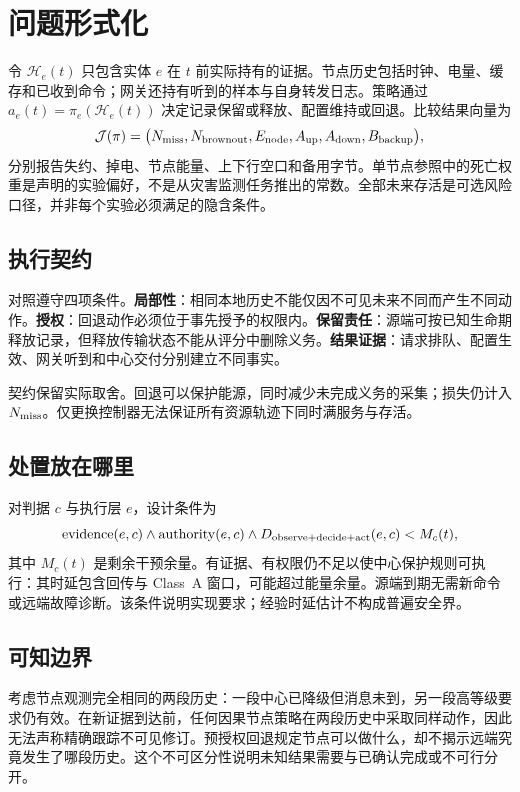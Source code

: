 \documentclass[11pt]{article}
\begin{document}
\section{问题形式化}
\label{sec:problem}

令 $\mathcal H_e(t)$ 只包含实体 $e$ 在 $t$ 前实际持有的证据。节点历史包括时钟、电量、缓存和已收到命令；网关还持有听到的样本与自身转发日志。策略通过 $a_e(t)=\pi_e(\mathcal H_e(t))$ 决定记录保留或释放、配置维持或回退。比较结果向量为
\begin{equation}
\mathcal J(\pi)=\bigl(N_{\rm miss},N_{\rm brownout},E_{\rm node},A_{\rm up},A_{\rm down},B_{\rm backup}\bigr),
\label{eq:obj}
\end{equation}
分别报告失约、掉电、节点能量、上下行空口和备用字节。单节点参照中的死亡权重是声明的实验偏好，不是从灾害监测任务推出的常数。全部未来存活是可选风险口径，并非每个实验必须满足的隐含条件。

\subsection{执行契约}
对照遵守四项条件。\textbf{局部性}：相同本地历史不能仅因不可见未来不同而产生不同动作。\textbf{授权}：回退动作必须位于事先授予的权限内。\textbf{保留责任}：源端可按已知生命期释放记录，但释放传输状态不能从评分中删除义务。\textbf{结果证据}：请求排队、配置生效、网关听到和中心交付分别建立不同事实。

契约保留实际取舍。回退可以保护能源，同时减少未完成义务的采集；损失仍计入 $N_{\rm miss}$。仅更换控制器无法保证所有资源轨迹下同时满服务与存活。

\subsection{处置放在哪里}
对判据 $c$ 与执行层 $e$，设计条件为
\begin{equation}
\operatorname{evidence}(e,c)\land\operatorname{authority}(e,c)
\land D_{\rm observe+decide+act}(e,c)<M_c(t),
\label{eq:placement}
\end{equation}
其中 $M_c(t)$ 是剩余干预余量。有证据、有权限仍不足以使中心保护规则可执行：其时延包含回传与 Class~A 窗口，可能超过能量余量。源端到期无需新命令或远端故障诊断。该条件说明实现要求；经验时延估计不构成普遍安全界。

\subsection{可知边界}
考虑节点观测完全相同的两段历史：一段中心已降级但消息未到，另一段高等级要求仍有效。在新证据到达前，任何因果节点策略在两段历史中采取同样动作，因此无法声称精确跟踪不可见修订。预授权回退规定节点可以做什么，却不揭示远端究竟发生了哪段历史。这个不可区分性说明未知结果需要与已确认完成或不可行分开。
\end{document}
